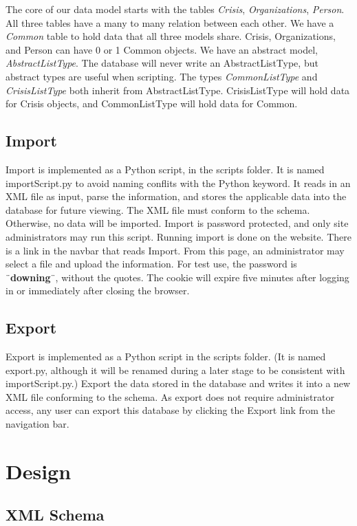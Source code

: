 \documentclass[12pt]{report}
\begin{document}
The core of our data model starts with the tables \emph{Crisis}, \emph{Organizations}, \emph{Person}.
All three tables have a many to many relation between each other.
We have a \emph{Common} table to hold data that all three models share.
Crisis, Organizations, and Person can have 0 or 1 Common objects.
We have an abstract model, \emph{AbstractListType}.
The database will never write an AbstractListType, but abstract types are useful when scripting.
The types \emph{CommonListType} and \emph{CrisisListType} both inherit from AbstractListType.
CrisisListType will hold data for Crisis objects, and CommonListType will hold data for Common.


\subsection*{Import}
\hfill


Import is implemented as a Python script, in the scripts folder.
It is named importScript.py to avoid naming conflits with the Python keyword.
It reads in an XML file as input, parse the information, and stores the applicable data into the database for future viewing.
The XML file must conform to the schema.
Otherwise, no data will be imported.
Import is password protected, and only site administrators may run this script.
Running import is done on the website.
There is a link in the navbar that reads Import.
From this page, an administrator may select a file and upload the information.
For test use, the password is ¨\textbf{downing}¨, without the quotes.
The cookie will expire five minutes after logging in or immediately after closing the browser.


\subsection*{Export}
\hfill


Export is implemented as a Python script in the scripts folder.
(It is named export.py, although it will be renamed during a later stage to be consistent with importScript.py.)
Export the data stored in the database and writes it into a new XML file conforming to the schema.
As export does not require administrator access, any user can export this database by clicking the Export link from the navigation bar.


\newpage
\section*{Design}
\subsection*{XML Schema}
\hfill
\end{document}
